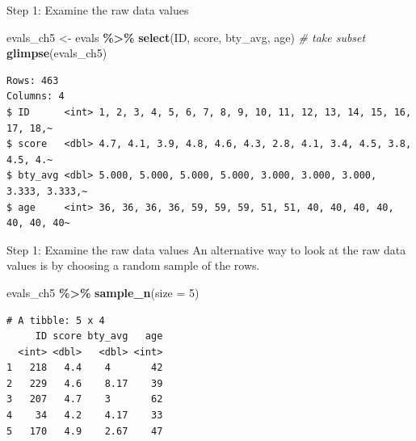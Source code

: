 \documentclass[
  ignorenonframetext,
]{beamer}
\newenvironment{Shaded}{\begin{snugshade}}{\end{snugshade}}
\newcommand{\AttributeTok}[1]{\textcolor[rgb]{0.13,0.29,0.53}{#1}}
\newcommand{\CommentTok}[1]{\textcolor[rgb]{0.56,0.35,0.01}{\textit{#1}}}
\newcommand{\DecValTok}[1]{\textcolor[rgb]{0.00,0.00,0.81}{#1}}
\newcommand{\FunctionTok}[1]{\textcolor[rgb]{0.13,0.29,0.53}{\textbf{#1}}}
\newcommand{\NormalTok}[1]{#1}
\newcommand{\OtherTok}[1]{\textcolor[rgb]{0.56,0.35,0.01}{#1}}
\newcommand{\SpecialCharTok}[1]{\textcolor[rgb]{0.81,0.36,0.00}{\textbf{#1}}}
\begin{document}
\begin{frame}[fragile]{Step 1: Examine the raw data values}
\protect\hypertarget{step-1-examine-the-raw-data-values}{}
\normalsize

\begin{Shaded}
\begin{Highlighting}[]
\NormalTok{evals\_ch5 }\OtherTok{\textless{}{-}}\NormalTok{ evals }\SpecialCharTok{\%\textgreater{}\%}
  \FunctionTok{select}\NormalTok{(ID, score, bty\_avg, age)   }\CommentTok{\# take subset}
\FunctionTok{glimpse}\NormalTok{(evals\_ch5)}
\end{Highlighting}
\end{Shaded}

\begin{verbatim}
Rows: 463
Columns: 4
$ ID      <int> 1, 2, 3, 4, 5, 6, 7, 8, 9, 10, 11, 12, 13, 14, 15, 16, 17, 18,~
$ score   <dbl> 4.7, 4.1, 3.9, 4.8, 4.6, 4.3, 2.8, 4.1, 3.4, 4.5, 3.8, 4.5, 4.~
$ bty_avg <dbl> 5.000, 5.000, 5.000, 5.000, 3.000, 3.000, 3.000, 3.333, 3.333,~
$ age     <int> 36, 36, 36, 36, 59, 59, 59, 51, 51, 40, 40, 40, 40, 40, 40, 40~
\end{verbatim}

\normalsize
\end{frame}

\begin{frame}[fragile]{Step 1: Examine the raw data values}
\protect\hypertarget{step-1-examine-the-raw-data-values-1}{}
An alternative way to look at the raw data values is by choosing a
random sample of the rows.

\normalsize

\begin{Shaded}
\begin{Highlighting}[]
\NormalTok{evals\_ch5 }\SpecialCharTok{\%\textgreater{}\%}
  \FunctionTok{sample\_n}\NormalTok{(}\AttributeTok{size =} \DecValTok{5}\NormalTok{)}
\end{Highlighting}
\end{Shaded}

\begin{verbatim}
# A tibble: 5 x 4
     ID score bty_avg   age
  <int> <dbl>   <dbl> <int>
1   218   4.4    4       42
2   229   4.6    8.17    39
3   207   4.7    3       62
4    34   4.2    4.17    33
5   170   4.9    2.67    47
\end{verbatim}

\normalsize
\end{frame}
\end{document}
